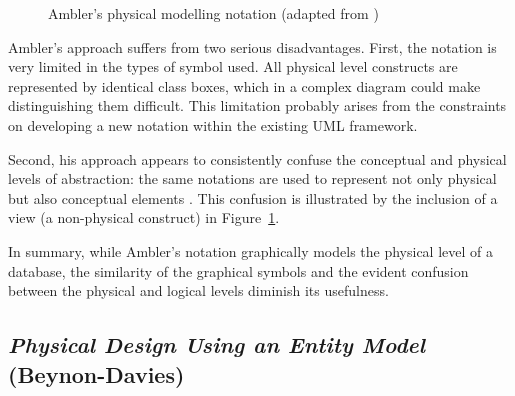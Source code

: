 \documentclass{CRPITStyle}
\begin{document}
\begin{figure}[htb]
	\caption{Ambler's physical modelling notation (adapted from \protect\cite{Ambl-SW-2003-ADT})}
	\label{fig-Ambler}
\end{figure}

Ambler's approach suffers from two serious disadvantages. First, the
notation is very limited in the types of symbol used. All physical level
constructs are represented by identical class boxes, which in a complex
diagram could make distinguishing them difficult. This limitation
probably arises from the constraints on developing a new notation within
the existing UML framework.

Second, his approach appears to consistently confuse the conceptual and
physical levels of abstraction: the same notations are used to represent
not only physical but also conceptual elements \cite{Ambl-SW-2003-ADT}.
This confusion is illustrated by the inclusion of a view (a non-physical
construct) in Figure~\ref{fig-Ambler}.

In summary, while Ambler's notation graphically models the physical
level of a database, the similarity of the graphical symbols and the
evident confusion between the physical and logical levels diminish its
usefulness.


\subsection{\emph{Physical Design Using an Entity Model} (Beynon-Davies)}
\end{document}
